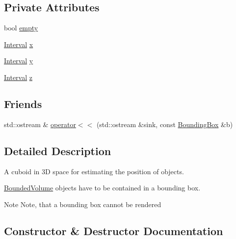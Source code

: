 \subsection*{Private Attributes}
\begin{DoxyCompactItemize}
\item 
bool \mbox{\hyperlink{classBoundingBox_a498e443b213cc08f7c0235688dd2ecf8}{empty}}
\item 
\mbox{\hyperlink{classInterval}{Interval}} \mbox{\hyperlink{classBoundingBox_a93ea5f12ef2300fe61925f6b44faaebe}{x}}
\item 
\mbox{\hyperlink{classInterval}{Interval}} \mbox{\hyperlink{classBoundingBox_a593fd6b66d3ed0352d92024685863090}{y}}
\item 
\mbox{\hyperlink{classInterval}{Interval}} \mbox{\hyperlink{classBoundingBox_a9a6005ebe3550447aad804123fa68fea}{z}}
\end{DoxyCompactItemize}
\subsection*{Friends}
\begin{DoxyCompactItemize}
\item 
std\+::ostream \& \mbox{\hyperlink{classBoundingBox_aa56e1d8e3d8c419be6c96f823f83648d}{operator$<$$<$}} (std\+::ostream \&sink, const \mbox{\hyperlink{classBoundingBox}{Bounding\+Box}} \&b)
\end{DoxyCompactItemize}


\subsection{Detailed Description}
A cuboid in 3D space for estimating the position of objects. 

\mbox{\hyperlink{classBoundedVolume}{Bounded\+Volume}} objects have to be contained in a bounding box. \begin{DoxyNote}{Note}
Note, that a bounding box cannot be rendered 
\end{DoxyNote}


\subsection{Constructor \& Destructor Documentation}
\mbox{\label{classBoundingBox_a4120184a9340ea9a0c43285c9d0f18bf}} 
